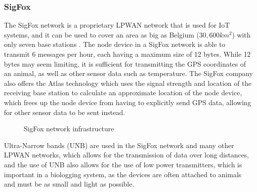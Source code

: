 \documentclass[sigplan,screen,nonacm]{acmart}
\begin{document}
\subsubsection{SigFox}
\label{subsec:SigFox}

The SigFox network is a proprietary LPWAN 
network that is used for IoT systems, and it can be used to cover an area as 
big as Belgium ($30,600 km^2$) with only seven base stations \cite{wild2023multi}. 
The node device in a SigFox network is able to transmit 6 messages per hour, 
each having a maximum size of 12 bytes. While 12 bytes may seem limiting, it is 
sufficient for transmitting the GPS coordinates of an animal, as well as other 
sensor data such as temperature\cite{wild2023multi}. The SigFox company also offers 
the Atlas technology which uses the signal strength and location of the receiving 
base station to calculate an approximate location of the node device, which frees up 
the node device from having to explicitly send GPS data, allowing for other sensor data 
to be sent instead\cite{wild2023multi}. 
\begin{figure}[htbp]
  \centering
  \caption{SigFox network infrastructure\cite{wild2023multi}}
  \label{fig:SigFox_infrastructure}
\end{figure}
Ultra-Narrow bands (UNB) are used in the SigFox 
network and many other LPWAN networks, which allows for the transmission of data
over long distances, and the use of UNB also allows for the use of low power
transmitters, which is important in a biologging system, as the devices are
often attached to animals and must be as small and light as possible.
\end{document}
